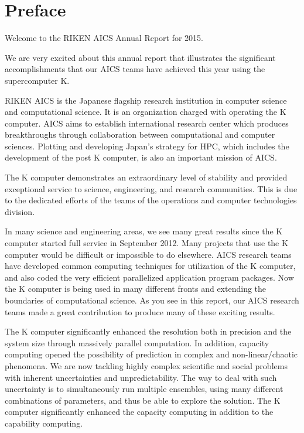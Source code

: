 \chapter*{Preface}
Welcome to the RIKEN AICS Annual Report for 2015.

We are very excited about this annual report that illustrates the significant accomplishments that our AICS teams have achieved this year using the supercomputer K.

RIKEN AICS is the Japanese flagship research institution in computer science and computational science. It is an organization charged with operating the K computer. AICS aims to establish international research center which produces breakthroughs through collaboration between computational and computer sciences. Plotting and developing Japan's strategy for HPC, which includes the development of the post K computer, is also an important mission of AICS.

The K computer demonstrates an extraordinary level of stability and provided exceptional service to science, engineering, and research communities. This is due to the dedicated efforts of the teams of the operations and computer technologies division.

In many science and engineering areas, we see many great results since the K computer started full service in September 2012. Many projects that use the K computer would be difficult or impossible to do elsewhere. AICS research teams have developed common computing techniques for utilization of the K computer, and also coded the very efficient parallelized application program packages. Now the K computer is being used in many different fronts and extending the boundaries of computational science. As you see in this report, our AICS research teams made a great contribution to produce many of these exciting results.

The K computer significantly enhanced the resolution both in precision and the system size through massively parallel computation. In addition, capacity computing opened the possibility of prediction in complex and non-linear/chaotic phenomena. We are now tackling highly complex scientific and social problems with inherent uncertainties and unpredictability. The way to deal with such uncertainty is to simultaneously run multiple ensembles, using many different combinations of parameters, and thus be able to explore the solution. The K computer significantly enhanced the capacity computing in addition to the capability computing.

